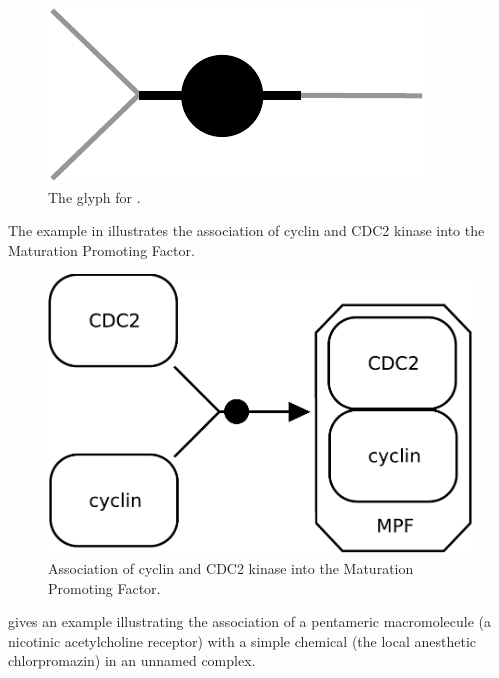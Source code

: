 \begin{figure}[H]
  \centering
  \includegraphics[scale = 0.5]{images/association}
  \caption{The \PD glyph for .}
  \label{fig:association}
\end{figure}

The example in  illustrates the association of cyclin and CDC2 kinase into the Maturation Promoting Factor.

\begin{figure}[H]
  \centering
  \includegraphics[scale = 0.3]{examples/association-MPF}
  \caption{Association of cyclin and CDC2 kinase into the Maturation Promoting Factor.}
  \label{fig:assoc-cyclin}
\end{figure}

 gives an example illustrating the association of a pentameric macromolecule (a nicotinic acetylcholine receptor) with a simple chemical (the local anesthetic chlorpromazin) in an unnamed complex.


